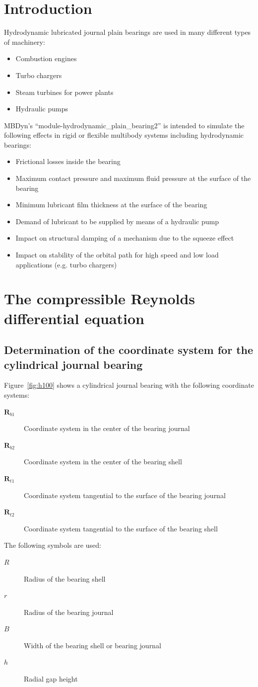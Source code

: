 \section{Introduction}
Hydrodynamic lubricated journal plain bearings are used in many different types of machinery:
\begin{itemize}
\item Combustion engines
\item Turbo chargers
\item Steam turbines for power plants
\item Hydraulic pumps
\end{itemize}
MBDyn's ``module-hydrodynamic\_plain\_bearing2'' is intended to simulate the following effects in rigid or flexible multibody systems including hydrodynamic bearings:
\begin{itemize}
\item Frictional losses inside the bearing
\item Maximum contact pressure and maximum fluid pressure at the surface of the bearing
\item Minimum lubricant film thickness at the surface of the bearing
\item Demand of lubricant to be supplied by means of a hydraulic pump
\item Impact on structural damping of a mechanism due to the squeeze effect
\item Impact on stability of the orbital path for high speed and low load applications (e.g. turbo chargers)
\end{itemize}

\section{The compressible Reynolds differential equation}
\subsection{Determination of the coordinate system for the cylindrical journal bearing}
Figure~\ref{fig:h100} shows a cylindrical journal bearing with the following coordinate systems:
\begin{description}
\item[$\boldsymbol{R}_{b1}$] Coordinate system in the center of the bearing journal
\item[$\boldsymbol{R}_{b2}$] Coordinate system in the center of the bearing shell
\item[$\boldsymbol{R}_{t1}$] Coordinate system tangential to the surface of the bearing journal
\item[$\boldsymbol{R}_{t2}$] Coordinate system tangential to the surface of the bearing shell
\end{description}
The following symbols are used:
\begin{description}
\item[$R$] Radius of the bearing shell
\item[$r$] Radius of the bearing journal
\item[$B$] Width of the bearing shell or bearing journal
\item[$h$] Radial gap height
\end{description}

